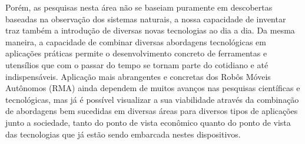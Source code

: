 Porém, as pesquisas nesta área não se baseiam puramente em descobertas baseadas
na observação dos sistemas naturais, a nossa capacidade de inventar traz também
a introdução de diversas novas tecnologias ao dia a dia. Da mesma maneira, a
capacidade de combinar diversas abordagens tecnológicas em aplicações práticas
permite o desenvolvimento concreto de ferramentas e utensílios que com o passar
do tempo se tornam parte do cotidiano e até indispensáveis. Aplicação mais
abrangentes e concretas dos Robôs Móveis Autônomos (RMA) ainda dependem de
muitos avanços nas pesquisas científicas e tecnológicas, mas já é possível
visualizar a sua viabilidade através da combinação de abordagens bem sucedidas
em diversas áreas para diversos tipos de aplicações junto a sociedade, tanto do
ponto de vista econômico quanto do ponto de vista das tecnologias que já estão
sendo embarcada nestes dispositivos.




%
%

% 
% 




